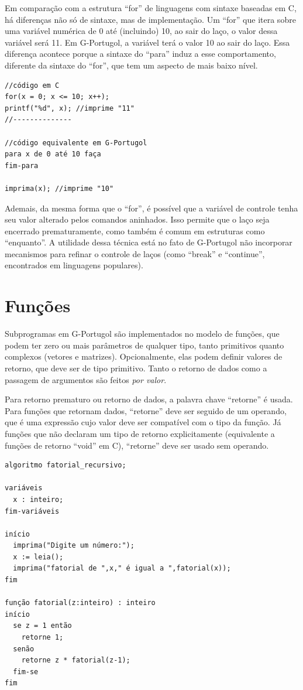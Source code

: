 \documentclass[a4paper,11pt]{report}
\begin{document}
Em comparação com a estrutura ``for'' de linguagens com sintaxe baseadas em C,
há diferenças não só de sintaxe, mas de implementação. Um ``for'' que itera
sobre uma variável numérica de 0 até (incluindo) 10, ao sair do laço, o valor
dessa variável será 11. Em G-Portugol, a variável terá o valor 10 ao sair do
laço. Essa diferença acontece porque a sintaxe do ``para'' induz a esse
comportamento, diferente da sintaxe do ``for'', que tem um aspecto de mais
baixo nível.

\begin{verbatim}
//código em C
for(x = 0; x <= 10; x++);
printf("%d", x); //imprime "11"
//--------------

//código equivalente em G-Portugol
para x de 0 até 10 faça
fim-para

imprima(x); //imprime "10"
\end{verbatim}

Ademais, da mesma forma que o ``for'', é possível que a variável de controle
tenha seu valor alterado pelos comandos aninhados. Isso permite que o laço seja
encerrado prematuramente, como também é comum em estruturas como ``enquanto''. A
utilidade dessa técnica está no fato de G-Portugol não incorporar mecanismos
para refinar o controle de laços (como ``break'' e ``continue'', encontrados em
linguagens populares).

\section{Funções}

Subprogramas em G-Portugol são implementados no modelo de funções, que podem ter
zero ou mais parâmetros de qualquer tipo, tanto primitivos quanto complexos
(vetores e matrizes). Opcionalmente, elas podem definir valores de retorno, que
deve ser de tipo primitivo. Tanto o retorno de dados como a passagem de
argumentos são feitos \textit{por valor}.

Para retorno prematuro ou retorno de dados, a palavra chave ``retorne'' é usada.
Para funções que retornam dados, ``retorne'' deve ser seguido de um operando,
que é uma expressão cujo valor deve ser compatível com o tipo da função. Já
funções que não declaram um tipo de retorno explicitamente (equivalente a
funções de retorno ``void'' em C), ``retorne'' deve ser usado sem operando.

\begin{program}[h!t]
 \begin{verbatim}
algoritmo fatorial_recursivo;

variáveis
  x : inteiro;
fim-variáveis

início
  imprima("Digite um número:");
  x := leia();
  imprima("fatorial de ",x," é igual a ",fatorial(x));
fim

função fatorial(z:inteiro) : inteiro
início
  se z = 1 então
    retorne 1;
  senão
    retorne z * fatorial(z-1);
  fim-se
fim
  \end{verbatim}
  \caption{Exemplo de algoritmo que utiliza funções.}
\end{program}
\end{document}
